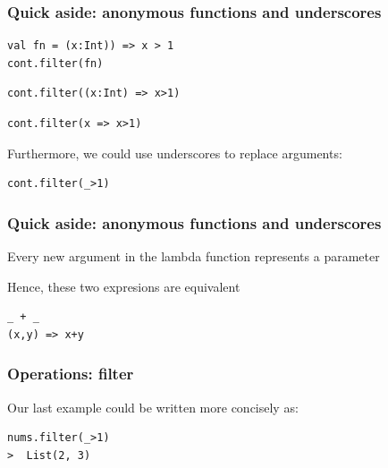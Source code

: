 \documentclass{beamer}
\begin{document}
\begin{frame}[fragile]
  \frametitle{Quick aside: anonymous functions and underscores}



\pause

\begin{lstlisting}[basicstyle=\ttfamily\Large]
val fn = (x:Int)) => x > 1
cont.filter(fn)
\end{lstlisting}


\begin{lstlisting}[basicstyle=\ttfamily\Large]
cont.filter((x:Int) => x>1)
\end{lstlisting}

\pause


\begin{lstlisting}[basicstyle=\ttfamily\Large]
cont.filter(x => x>1)
\end{lstlisting}

\pause

{\Large Furthermore, we could use underscores to replace arguments:}

\begin{lstlisting}[basicstyle=\ttfamily\huge]
cont.filter(_>1)
\end{lstlisting}

\end{frame}

\begin{frame}[fragile]
  \frametitle{Quick aside: anonymous functions and underscores}
  
{\large Every new argument in the lambda function represents a parameter
  
Hence, these two expresions are equivalent
}
  
\begin{lstlisting}[basicstyle=\ttfamily\huge]
_ + _
(x,y) => x+y
\end{lstlisting}


\end{frame}

\begin{frame}[fragile]
  \frametitle{Operations: filter}
  
\Large Our last example could be written more concisely as:

\vfill

\begin{lstlisting}[linebackgroundcolor={\btLstHL<1>{1}},basicstyle=\ttfamily\Large]
nums.filter(_>1) 
>  List(2, 3)
\end{lstlisting}

\end{frame}
\end{document}
